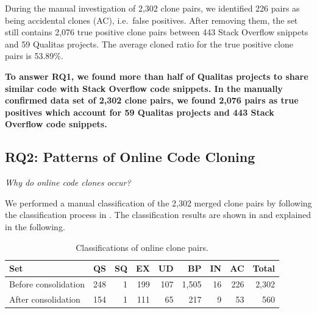 \documentclass[10pt,journal,compsoc]{IEEEtran}
\begin{document}
During the manual investigation of 2,302 clone pairs, we identified 226 pairs
as being accidental clones (AC), i.e.~false positives. After removing
them, the set still contains 2,076 true positive clone pairs between 443 Stack
Overflow snippets and 59 Qualitas projects. The average cloned ratio for the
true positive clone pairs is 53.89\%.

\textbf{To answer RQ1, we found more than half of Qualitas projects to share
	similar code with Stack Overflow code snippets. In the manually confirmed 
	data set of 2,302 clone pairs, we found 2,076 pairs as true positives which 
	account for 59 Qualitas projects and
	443 Stack Overflow code snippets.}

\subsection{RQ2: Patterns of Online Code Cloning}
\vspace{0.25cm}
\textit{Why do online code clones occur?}
\vspace{0.25cm}

We performed a manual classification
of the 2,302 merged clone pairs by following the classification process
in . 
The classification results are shown in  
and explained in the following.

\begin{table}
	\centering
	\caption{Classifications of online clone pairs.}
	\label{tab:classification_good_o}
	\begin{tabular}{lrrrrrrrr}
		\toprule
		Set & QS & SQ & EX & UD & BP & IN & AC & Total \\ 
		\midrule
		Before consolidation & 248 & 1 & 199 & 107 & 1,505 & 16 & 226 & 2,302 \\
		After consolidation & 154 & 1 & 111 & 65 & 217 & 9 & 53 & 560 \\
		\bottomrule
	\end{tabular} 
\end{table}
\end{document}
